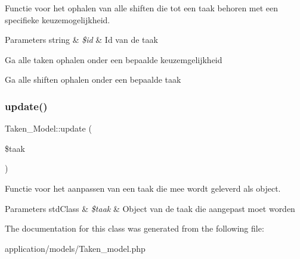 Functie voor het ophalen van alle shiften die tot een taak behoren met een specifieke keuzemogelijkheid. 
\begin{DoxyParams}[1]{Parameters}
string & {\em \$id} & Id van de taak \\
\hline
\end{DoxyParams}
Ga alle taken ophalen onder een bepaalde keuzemgelijkheid

Ga alle shiften ophalen onder een bepaalde taak \mbox{\label{class_taken___model_ab4e93ac196a1aeb83582faa332619c86}} 
\subsubsection{\texorpdfstring{update()}{update()}}
{\footnotesize\ttfamily Taken\+\_\+\+Model\+::update (\begin{DoxyParamCaption}\item[{}]{\$taak }\end{DoxyParamCaption})}

Functie voor het aanpassen van een taak die mee wordt geleverd als object. 
\begin{DoxyParams}[1]{Parameters}
std\+Class & {\em \$taak} & Object van de taak die aangepast moet worden \\
\hline
\end{DoxyParams}


The documentation for this class was generated from the following file\+:\begin{DoxyCompactItemize}
\item 
application/models/Taken\+\_\+model.\+php\end{DoxyCompactItemize}
